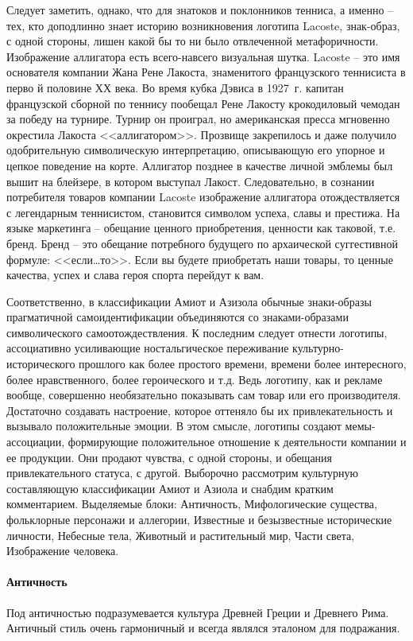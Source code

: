 Следует заметить, однако, что для знатоков и поклонников тенниса, а именно -- тех,
кто доподлинно знает историю возникновения логотипа Lacoste, знак-образ, с одной
стороны, лишен какой бы то ни было отвлеченной метафоричности. Изображение
аллигатора есть всего-навсего визуальная шутка. Lacoste -- это имя основателя
компании Жана Рене Лакоста, знаменитого французского теннисиста в перво
й половине ХХ века. Во время кубка Дэвиса в 1927~г. капитан французской
сборной по теннису пообещал Рене Лакосту крокодиловый чемодан за победу на турнире.
Турнир он проиграл, но американская пресса мгновенно окрестила Лакоста <<аллигатором>>.
Прозвище закрепилось и даже получило одобрительную символическую интерпретацию,
описывающую его упорное и цепкое поведение на корте. Аллигатор позднее в качестве
личной эмблемы был вышит на блейзере, в котором выступал Лакост. Следовательно,
в сознании потребителя товаров компании Lacoste изображение аллигатора
отождествляется с легендарным теннисистом, становится символом успеха, славы и
престижа. На языке маркетинга -- обещание ценного приобретения, ценности как
таковой, т.е. бренд. Бренд -- это обещание потребного будущего по архаической
суггестивной формуле: <<если\ldots то>>. Если вы будете приобретать наши товары,
то ценные качества, успех и слава героя спорта перейдут к вам.

Соответственно, в классификации Амиот и Азизола обычные знаки-образы прагматичной
самоидентификации объединяются со знаками-образами символического
самоотождествления. К последним следует отнести логотипы, ассоциативно усиливающие
ностальгическое переживание культурно-исторического прошлого как более
простого времени, времени более интересного, более нравственного, более
героического и т.д. Ведь логотипу, как и рекламе вообще, совершенно необязательно
показывать сам товар или его производителя. Достаточно создавать настроение,
которое оттеняло бы их привлекательность и вызывало положительные эмоции.
В этом смысле, логотипы создают мемы-ассоциации, формирующие положительное
отношение к деятельности компании и ее продукции. Они продают чувства,
с одной стороны, и обещания привлекательного статуса, с другой. Выборочно
рассмотрим культурную составляющую классификации Амиот и Азиола и снабдим кратким
комментарием. Выделяемые блоки: Античность, Мифологические существа, фольклорные
персонажи и аллегории, Известные и безызвестные исторические личности, Небесные
тела, Животный и растительный мир, Части света, Изображение человека.

\paragraph{Античность}
Под античностью подразумевается культура Древней Греции и Древнего Рима.
Античный стиль очень гармоничный и всегда являлся эталоном для подражания.

